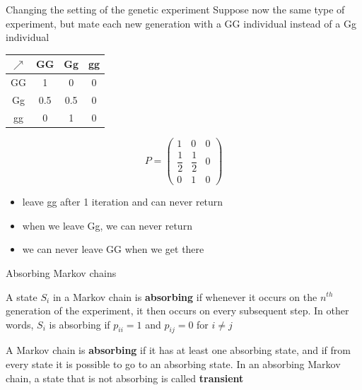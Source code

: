 \documentclass[aspectratio=169]{beamer}
\begin{document}
\begin{frame}{Changing the setting of the genetic experiment}
Suppose now the same type of experiment, but mate each new generation with a GG individual instead of a Gg individual
\vfill
\begin{center}
\end{center}
\vfill
\begin{minipage}{0.45\textwidth}
	\begin{center}
		\begin{tabular}{c|ccc}
		$\nearrow$ & GG & Gg & gg \\
		\hline
		GG & 1 & 0 & 0 \\
		Gg & 0.5 & 0.5 & 0 \\
		gg & 0 & 1 & 0
		\end{tabular}
	\end{center}
\end{minipage}
\begin{minipage}{0.45\textwidth}
	\[
		P=\begin{pmatrix}
		1 & 0 & 0 \\[2pt]
		\dfrac 12 & \dfrac 12 & 0 \\[7pt]
		0 & 1 & 0
		\end{pmatrix}
	\]
\end{minipage}
\begin{itemize}
\item leave gg after 1 iteration and can never return
\item when we leave Gg, we can never return
\item we can never leave GG when we get there
\end{itemize}
\end{frame}


\begin{frame}{Absorbing Markov chains}
\begin{definition}
A state $S_i$ in a Markov chain is \textbf{absorbing} if whenever it occurs on the $n^{th}$ generation of the experiment, it then occurs on every subsequent step. In other words, $S_i$ is absorbing if $p_{ii}=1$ and $p_{ij}=0$ for $i\neq j$
\end{definition}
\vfill
\begin{definition}
A Markov chain is \textbf{absorbing} if it has at least one absorbing state, and if from every state it is possible to go to an absorbing state.
In an absorbing Markov chain, a state that is not absorbing is called \textbf{transient}
\end{definition}
\end{frame}
\end{document}

